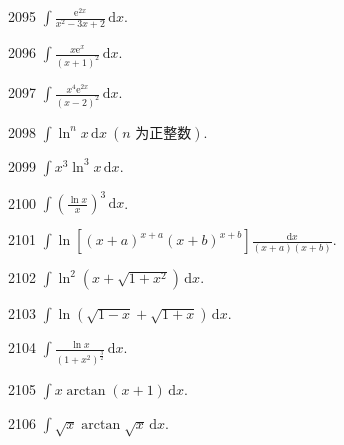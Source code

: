 \begin{prob}[S]{2095}
$\int \frac{\mathrm{e}^{2x}}{x^2 - 3x + 2} \,\mathrm{d}x$.
\end{prob}

\begin{prob}[S]{2096}
$\int \frac{x\mathrm{e}^x}{(x + 1)^2} \,\mathrm{d}x$.
\end{prob}

\begin{prob}[S]{2097}
$\int \frac{x^4 \mathrm{e}^{2x}}{(x - 2)^2} \,\mathrm{d}x$.
\end{prob}


\begin{prob}[S]{2098}
$\int \ln^n x \,\mathrm{d}x \ (n \text{ 为正整数})$.
\end{prob}

\begin{prob}[S]{2099}
$\int x^3 \ln^3 x \,\mathrm{d}x$.
\end{prob}

\begin{prob}[S]{2100}
$\int \left(\frac{\ln x}{x}\right)^3 \,\mathrm{d}x$.
\end{prob}

\begin{prob}[S]{2101}
$\int \ln \left[(x + a)^{x + a}(x + b)^{x + b}\right] \frac{\mathrm{d}x}{(x + a)(x + b)}$.
\end{prob}

\begin{prob}[S]{2102}
$\int \ln^2(x + \sqrt{1 + x^2}) \,\mathrm{d}x$.
\end{prob}

\begin{prob}[S]{2103}
$\int \ln(\sqrt{1 - x} + \sqrt{1 + x}) \,\mathrm{d}x$.
\end{prob}

\begin{prob}[S]{2104}
$\int \frac{\ln x}{(1 + x^2)^{\frac{3}{2}}} \,\mathrm{d}x$.
\end{prob}

\begin{prob}[S]{2105}
$\int x \arctan(x + 1) \,\mathrm{d}x$.
\end{prob}

\begin{prob}[S]{2106}
$\int \sqrt{x} \arctan \sqrt{x} \,\mathrm{d}x$.
\end{prob}


